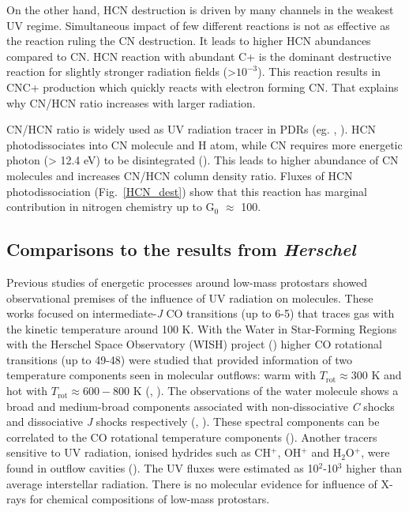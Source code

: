 \documentclass{aa}
\begin{document}
On the other hand, HCN destruction is driven by many channels in the weakest UV regime. Simultaneous
impact of few different reactions is not as effective as the reaction ruling the CN destruction. It
leads to higher HCN abundances compared to CN. HCN reaction with abundant C+ is the dominant
destructive reaction for slightly stronger radiation fields (>$10^{-3}$). This reaction results in
CNC+ production which quickly reacts with electron forming CN. That explains why CN/HCN ratio
increases with larger radiation.

CN/HCN ratio is widely used as UV radiation tracer in PDRs (eg. \citealt{Thi04}, \citealt{Han15}).
HCN photodissociates into CN molecule and H atom, while CN requires more energetic photon (> 12.4
eV) to be disintegrated (\citealt{vDi87}). This leads to higher abundance of CN molecules and
increases CN/HCN column density ratio. Fluxes of HCN photodissociation (Fig.~\ref{HCN_dest}) show
that this reaction has marginal contribution in nitrogen chemistry up to G$_0$ $\approx$ 100.

\subsection{Comparisons to the results from \textit{Herschel}}

Previous studies of energetic processes around low-mass protostars showed observational premises of
the influence of UV radiation on molecules. These works focused on intermediate-\textit{J} CO
transitions (up to 6-5) that traces gas with the kinetic temperature around 100 K. With the Water in
Star-Forming Regions with the Herschel Space Observatory (WISH) project (\citealt{vDi11}) higher CO
rotational transitions (up to 49-48) were studied that provided information of two temperature
components seen in molecular outflows: warm with $T_\mathrm{rot} \approx 300$ K and hot with
$T_\mathrm{rot} \approx 600-800$ K (\citealt{Kar13}, \citealt{Gre13}). The observations of the water
molecule shows a broad and medium-broad components associated with non-dissociative \textit{C}
shocks and dissociative \textit{J} shocks respectively (\citealt{Kri13}, \citealt{Mot14}). These
spectral components can be correlated to the CO rotational temperature components (\citealt{Kri17}).
Another tracers sensitive to UV radiation, ionised hydrides such as CH$^+$, OH$^+$ and H$_2$O$^+$,
were found in outflow cavities (\citealt{Ben16}). The UV fluxes were estimated as 10$^2$-10$^3$
higher than average interstellar radiation. There is no molecular evidence for influence of X-rays
for chemical compositions of low-mass protostars.
\end{document}
